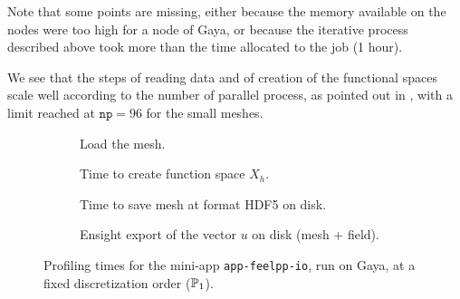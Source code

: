 Note that some points are missing, either because the memory available on the nodes were too high for a node of Gaya, or because the iterative process described above took more than the time allocated to the job (1 hour).

We see that the steps of reading data and of creation of the functional spaces scale well according to the number of parallel process, as pointed out in , with a limit reached at $\texttt{np}=96$ for the small meshes.


\begin{figure}
  \begin{subfigure}[c]{0.49\textwidth}
    \centering
    \caption{ Load the mesh. }
    \label{fig:specs:app-feelpp-io:np:loadmesh}
  \end{subfigure}
  \begin{subfigure}[c]{0.49\textwidth}
    \centering
    \caption{ Time to create function space $X_h$. }
    \label{fig:specs:app-feelpp-io:np:functionspace}
  \end{subfigure}
  \begin{subfigure}[c]{0.49\textwidth}
    \centering
    \caption{ Time to save mesh at format HDF5 on disk. }
    \label{fig:specs:app-feelpp-io:np:savemesh}
  \end{subfigure}
  \begin{subfigure}[c]{0.49\textwidth}
    \centering
    \caption{ Ensight export of the vector $u$ on disk (mesh + field). }
    \label{fig:specs:app-feelpp-io:np:export}
  \end{subfigure}
  \caption{Profiling times for the mini-app \texttt{app-feelpp-io}, run on Gaya, at a fixed discretization order ($\mathbb{P}_1$).}
  \label{fig:specs:app-feelpp-io:np}
\end{figure}


\dataLoadMesh
{}\dataFunctionSpace
{}\dataSaveMesh
{}\dataExportData



